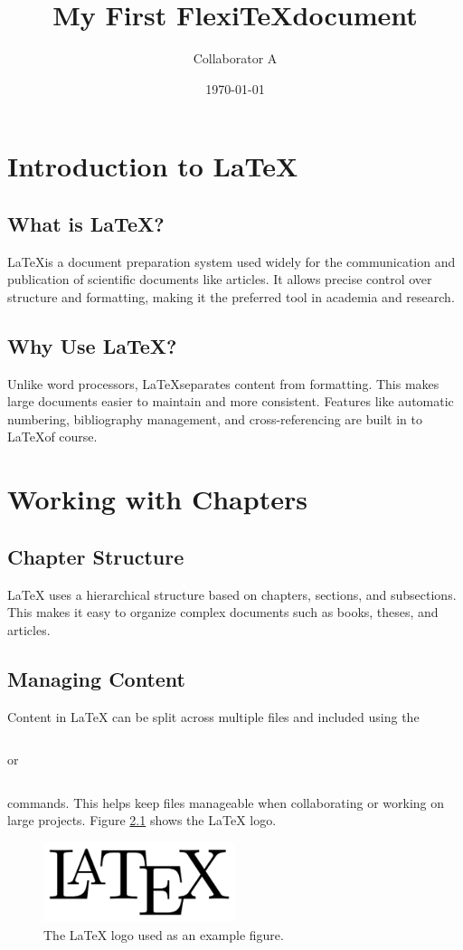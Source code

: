 \documentclass{report}
\title{My First Flexi\TeX document}
\author{Collaborator A}
\date{\today}
\begin{document}
\maketitle
\chapter{Introduction to \LaTeX}
\section{What is \LaTeX?}
\LaTeX is a document preparation system used widely for the communication and publication of scientific documents like articles. It allows precise control over structure and formatting, making it the preferred tool in academia and research.
\section{Why Use \LaTeX?}
Unlike word processors,
\LaTeX separates content from formatting. This makes large documents easier to maintain and more consistent. Features like automatic numbering, bibliography management, and cross-referencing are built in to
\LaTeX of course.
\chapter{Working with Chapters}
\section{Chapter Structure}
LaTeX uses a hierarchical structure based on chapters, sections, and subsections. This makes it easy to organize complex documents such as books, theses, and articles.
\section{Managing Content}
Content in LaTeX can be split across multiple files and included using the
\begin{verbatim}

\end{verbatim}
or
\begin{verbatim}

\end{verbatim}
commands. This helps keep files manageable when collaborating or working on large projects. Figure
\ref{fig:latex-logo}
shows the LaTeX logo.
\begin{figure}[h]
\centering
\includegraphics[width=0.5\textwidth]{figs/logo.png}
\caption{The LaTeX logo used as an example figure.}
\label{fig:latex-logo}
\end{figure}
\end{document}
